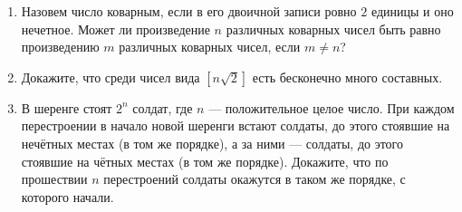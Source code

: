 \documentclass{article}
\begin{document}
\begin{enumerate}[label*=\protect\fbox{\arabic{enumi}}]
\item Назовем число коварным, если в его двоичной записи ровно $2$ единицы и оно нечетное. Может ли произведение $n$ различных коварных чисел быть равно произведению $m$ различных коварных чисел, если $m \neq n$?

\item Докажите, что среди чисел вида $[{n\sqrt{2}}]$ есть бесконечно много составных.

\item В шеренге стоят $2^n$ солдат, где $n$ — положительное целое число. При каждом перестроении в начало новой шеренги встают солдаты, до этого стоявшие на нечётных местах (в том же порядке), а за ними — солдаты, до этого стоявшие на чётных местах (в том же порядке). Докажите, что по прошествии $n$ перестроений солдаты окажутся в таком же порядке, с которого начали.

\end{enumerate}
\end{document}
